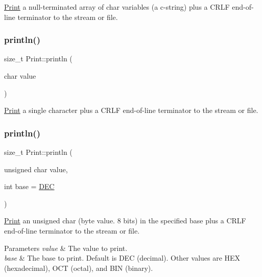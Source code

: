 \hyperlink{class_print}{Print} a null-\/terminated array of char variables (a c-\/string) plus a C\+R\+LF end-\/of-\/line terminator to the stream or file. 

\mbox{\label{class_print_a80fdd92db4b396062586bcb3e08d3835}} 
\subsubsection{\texorpdfstring{println()}{println()}\hspace{0.1cm}{\footnotesize\ttfamily [12/21]}}
{\footnotesize\ttfamily size\+\_\+t Print\+::println (\begin{DoxyParamCaption}\item[{char}]{value }\end{DoxyParamCaption})}



\hyperlink{class_print}{Print} a single character plus a C\+R\+LF end-\/of-\/line terminator to the stream or file. 

\mbox{\label{class_print_a000b3fd5b723cb6c7db0d3231a9ef2f8}} 
\subsubsection{\texorpdfstring{println()}{println()}\hspace{0.1cm}{\footnotesize\ttfamily [13/21]}}
{\footnotesize\ttfamily size\+\_\+t Print\+::println (\begin{DoxyParamCaption}\item[{unsigned char}]{value,  }\item[{int}]{base = {\ttfamily \hyperlink{docs_2src_2spark__wiring__print_8h_a26e216c38cffa0a9965fa7933ba558b1}{D\+EC}} }\end{DoxyParamCaption})}



\hyperlink{class_print}{Print} an unsigned char (byte value. 8 bits) in the specified base plus a C\+R\+LF end-\/of-\/line terminator to the stream or file. 


\begin{DoxyParams}{Parameters}
{\em value} & The value to print. \\
\hline
{\em base} & The base to print. Default is D\+EC (decimal). Other values are H\+EX (hexadecimal), O\+CT (octal), and B\+IN (binary). \\
\hline
\end{DoxyParams}
\mbox{\label{class_print_a82aa91bbd859f28a0a3b4869e5bfcadd}} 
